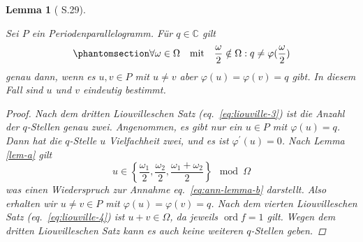 \documentclass[12pt]{article}
\newtheorem{lemma}[theorem]{Lemma}
\numberwithin{equation}{section}
\newcommand{\ohalbe}{\frac{\omega}{2}}
\newcommand{\kk}{\cite{kk} }
\begin{document}
\begin{lemma}[\kk S.29]\label{lem-b}

Sei \(P\) ein Periodenparallelogramm. Für \(q \in \mathbb C\) gilt
\begin{equation}\protect\phantomsection\label{eq:ann-lemma-b}{
\forall \omega \in \Omega \quad \text{mit} \quad  \ohalbe \notin \Omega : q \ne \varphi(\ohalbe)
}\end{equation} genau dann, wenn es \(u, v \in P\) mit \(u \ne v\) aber
\(\varphi (u) = \varphi (v)=q\) gibt. In diesem Fall sind \(u\) und
\(v\) eindeutig bestimmt.

\begin{proof}

Nach dem dritten Liouvilleschen Satz (eq.~\ref{eq:liouville-3}) ist die
Anzahl der \(q\)-Stellen genau zwei. Angenommen, es gibt nur ein
\(u \in P\) mit \(\varphi (u)=q\). Dann hat die \(q\)-Stelle \(u\)
Vielfachheit zwei, und es ist \(\varphi ^\prime(u)=0\). Nach Lemma
\ref{lem-a} gilt \begin{equation}{
u \in \left\lbrace  \frac{\omega_1}{2},  \frac{\omega_2}{2}, \frac{\omega_1 + \omega_2}{2}  \right\rbrace  \mod \Omega
}\end{equation} was einen Wiederspruch zur Annahme
eq.~\ref{eq:ann-lemma-b} darstellt. Also erhalten wir \(u \ne v \in P\)
mit \(\varphi(u)=\varphi(v)=q\). Nach dem vierten Liouvilleschen Satz
(eq.~\ref{eq:liouville-4}) ist \(u+v \in \Omega\), da jeweils
\(\operatorname{ord} f=1\) gilt. Wegen dem dritten Liouvilleschen Satz
kann es auch keine weiteren \(q\)-Stellen geben.

\end{proof}

\end{lemma}
\end{document}
